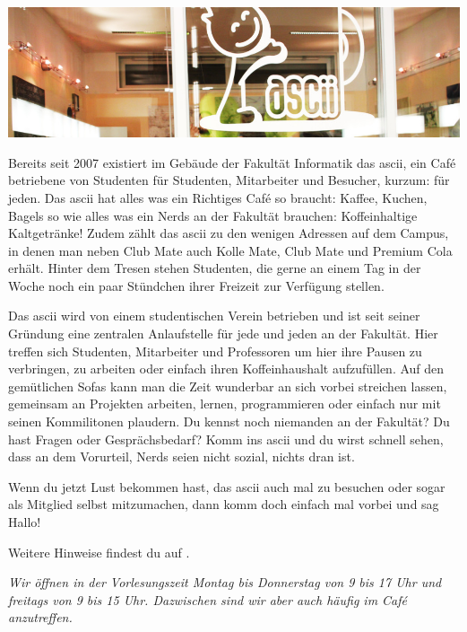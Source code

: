
\includegraphics[width=\linewidth]{img/ascii.jpg}

Bereits seit 2007 existiert im Gebäude der Fakultät Informatik das ascii, ein Café betriebene von Studenten für Studenten, Mitarbeiter und Besucher, kurzum: für jeden.
Das ascii hat alles was ein Richtiges Café so braucht: Kaffee, Kuchen, Bagels so wie alles was ein Nerds an der Fakultät brauchen: Koffeinhaltige Kaltgetränke!
Zudem zählt das ascii zu den wenigen Adressen auf dem Campus, in denen man neben Club Mate auch Kolle Mate, Club Mate und Premium Cola erhält.
Hinter dem Tresen stehen Studenten, die gerne an einem Tag in der Woche noch ein paar Stündchen ihrer Freizeit zur Verfügung stellen.

Das ascii wird von einem studentischen Verein betrieben und ist seit seiner Gründung eine zentralen Anlaufstelle für jede und jeden an der Fakultät.
Hier treffen sich Studenten, Mitarbeiter und Professoren um hier ihre Pausen zu verbringen,
zu arbeiten oder einfach ihren Koffeinhaushalt aufzufüllen.
Auf den gemütlichen Sofas kann man die Zeit wunderbar an sich vorbei streichen lassen,
gemeinsam an Projekten arbeiten, lernen, programmieren oder einfach nur mit seinen Kommilitonen plaudern.
Du kennst noch niemanden an der Fakultät?
Du hast Fragen oder Gesprächsbedarf?
Komm ins ascii und du wirst schnell sehen, dass an dem Vorurteil, Nerds seien nicht sozial, nichts dran ist.

Wenn du jetzt Lust bekommen hast, das ascii auch mal zu besuchen oder sogar als Mitglied selbst mitzumachen, dann komm doch einfach mal vorbei und sag Hallo!

Weitere Hinweise findest du auf .

\textit{Wir öffnen in der Vorlesungszeit Montag bis Donnerstag von 9 bis 17 Uhr und freitags von 9 bis 15 Uhr. Dazwischen sind wir aber auch häufig im Café anzutreffen.}

